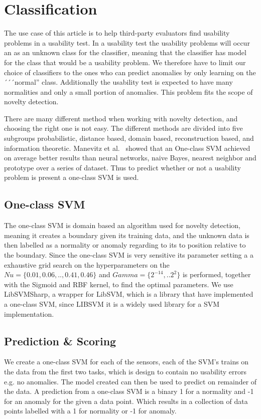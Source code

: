 \section{Classification}
The use case of this article is to help third-party evaluators find usability problems in a usability test.
In a usability test the usability problems will occur an as an unknown class for the classifier, meaning that the classifier has model for the class that would be a usability problem. 
We therefore have to limit our choice of classifiers to the ones who can predict anomalies by only learning on the ´´´normal'' class.
Additionally the usability test is expected to have many normalities and only a small portion of anomalies.
This problem fits the scope of novelty detection\cite{noveltyDetection}.

There are many different method when working with novelty detection\cite{noveltyDetection}, and choosing the right one is not easy.
The different methods are divided into five subgroups probabilistic, distance based, domain based, reconstruction based, and information theoretic.
Manevitz et al.~\cite{oneClassSVM} showed that an One-class SVM achieved on average better results than neural networks, naive Bayes, nearest neighbor and prototype over a series of dataset.
Thus to predict whether or not a usability problem is present a one-class SVM is used.

\subsection{One-class SVM}
The one-class SVM is domain based an algorithm used for novelty detection, meaning it creates a boundary given its training data, and the unknown data is then labelled as a normality or anomaly regarding to its to position relative to the boundary.
Since the one-class SVM is very sensitive\cite{oneClassSVM} its parameter setting a a exhaustive grid search on the hyperparameters on the $Nu = \{0.01,0.06,..,0.41, 0.46\}$ and $Gamma = \{2^{-14},..2^2\}$ is performed, together with the Sigmoid and RBF kernel, to find the optimal parameters.
We use LibSVMSharp\cite{libsvmsharp}, a wrapper for LibSVM\cite{libsvm}, which is a library that have implemented a one-class SVM, since LIBSVM it is a widely used library for a SVM implementation.

\subsection{Prediction \& Scoring}
We create a one-class SVM for each of the sensors, each of the SVM's trains on the data from the first two tasks, which is design to contain no usability errors e.g. no anomalies. The model created can then be used to predict on remainder of the data.
A prediction from a one-class SVM is a binary 1 for a normality and -1 for an anomaly for the given a data point.
Which results in a collection of data points labelled with a 1 for normality or -1 for anomaly.

